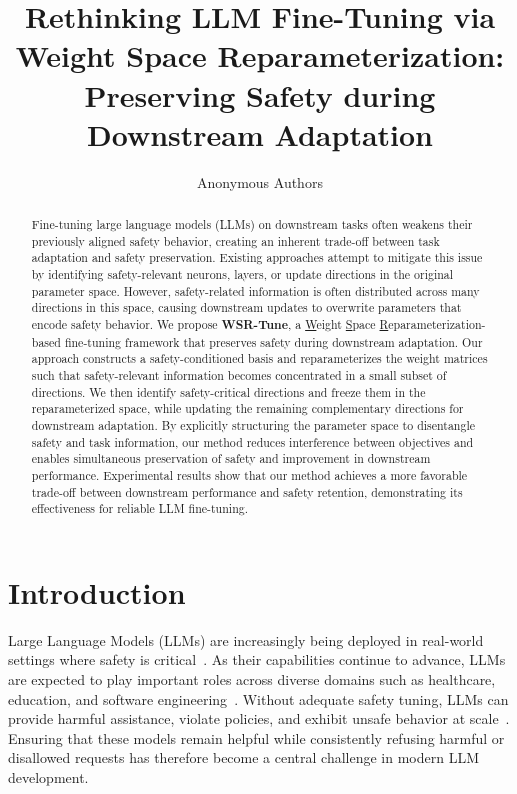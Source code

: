 \documentclass{article}
\title{Rethinking LLM Fine-Tuning via Weight Space Reparameterization: Preserving Safety during Downstream Adaptation}
\author{Anonymous Authors}
\begin{document}
\maketitle


\begin{abstract}
Fine-tuning large language models (LLMs) on downstream tasks often weakens their previously aligned safety behavior, creating an inherent trade-off  between task adaptation and safety preservation. Existing approaches attempt to mitigate this issue by identifying safety-relevant neurons, layers, or update directions in the original parameter space. However, safety-related information is often distributed across many directions in this space, causing downstream updates to overwrite parameters that encode safety behavior. 
We propose \textbf{WSR-Tune}, a \uline{W}eight \uline{S}pace \uline{R}eparameterization-based fine-tuning framework that preserves safety during downstream adaptation. Our approach constructs a safety-conditioned basis and reparameterizes the weight matrices such that safety-relevant information becomes concentrated in a small subset of directions. We then identify safety-critical directions and freeze them in the reparameterized space, while updating the remaining complementary directions for downstream adaptation. By explicitly structuring the parameter space to disentangle safety and task information, our method reduces interference between objectives and enables simultaneous preservation of safety and improvement in downstream performance. %
 Experimental results show that our method achieves a more favorable trade-off between downstream performance and safety retention, demonstrating its effectiveness for reliable LLM fine-tuning. 
\end{abstract}

\section{Introduction}
\label{sec:introduction}


Large Language Models (LLMs) are increasingly being deployed in real-world settings where safety is critical~\citep{trustllm}. As their capabilities continue to advance, LLMs are expected to play important roles across diverse domains such as healthcare, education, and software engineering~\citep{bloomberggptl, chatgpt4good, gptcode, swebench}. Without adequate safety tuning, LLMs can provide harmful assistance, violate policies, and exhibit unsafe behavior at scale~\citep{chan0park}. Ensuring that these models remain helpful while consistently refusing harmful or disallowed requests has therefore become a central challenge in modern LLM development.
\end{document}
